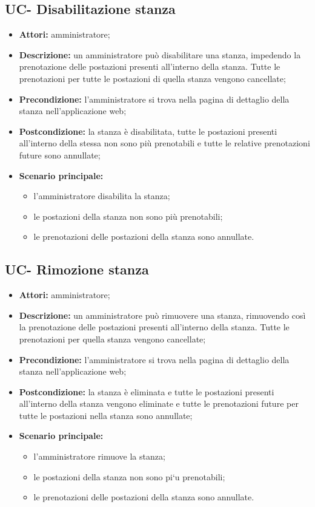 \subsection{UC- Disabilitazione stanza}
\begin{itemize}
    \item \textbf{Attori:} amministratore;
    \item \textbf{Descrizione:} un amministratore pu\`{o} disabilitare una stanza, impedendo la prenotazione delle postazioni presenti all'interno della stanza. Tutte le prenotazioni per tutte le postazioni di quella stanza vengono cancellate;
    \item \textbf{Precondizione:} l'amministratore si trova nella pagina di dettaglio della stanza nell'applicazione web;
    \item \textbf{Postcondizione:} la stanza \`{e} disabilitata, tutte le postazioni presenti all'interno della stessa non sono pi\`{u} prenotabili e tutte le relative prenotazioni future sono annullate;
    \item \textbf{Scenario principale:}
    \begin{itemize}
        \item l'amministratore disabilita la stanza;
        \item le postazioni della stanza non sono pi\`{u} prenotabili;
        \item le prenotazioni delle postazioni della stanza sono annullate.
    \end{itemize}
\end{itemize}


\subsection{UC- Rimozione stanza}
\begin{itemize}
    \item \textbf{Attori:} amministratore;
    \item \textbf{Descrizione:} un amministratore pu\`{o} rimuovere una stanza, rimuovendo cos\`{i} la prenotazione delle postazioni presenti all'interno della stanza. Tutte le prenotazioni per quella stanza vengono cancellate;
    \item \textbf{Precondizione:} l'amministratore si trova nella pagina di dettaglio della stanza nell'applicazione web;
    \item \textbf{Postcondizione:} la stanza \`{e} eliminata e tutte le postazioni presenti all'interno della stanza vengono eliminate e tutte le prenotazioni future per tutte le postazioni nella stanza sono annullate;
    \item \textbf{Scenario principale:}
    \begin{itemize}
        \item l'amministratore rimuove la stanza;
        \item le postazioni della stanza non sono pi`{u} prenotabili;
        \item le prenotazioni delle postazioni della stanza sono annullate.
    \end{itemize}
\end{itemize}



